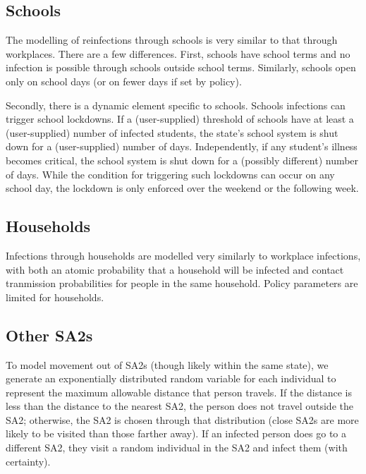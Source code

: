 \documentclass{grattan}
\begin{document}
\subsection{Schools}

The modelling of reinfections through schools is very similar to that through workplaces.
There are a few differences.
First, schools have school terms and no infection is possible through schools outside school terms.
Similarly, schools open only on school days (or on fewer days if set by policy).

Secondly, there is a dynamic element specific to schools. Schools infections can trigger school
lockdowns. If a (user-supplied) threshold of schools have at least a (user-supplied) number of 
infected students, the state's school system is shut down for a (user-supplied) number of days.
Independently, if any student's illness becomes critical, the school system is shut down for 
a (possibly different) number of days.  While the condition for triggering such lockdowns can occur
on any school day, the lockdown is only enforced over the weekend or the following week.

\subsection{Households}

Infections through households are modelled very similarly to workplace infections, 
with both an atomic probability that a household will be infected and contact
tranmission probabilities for people in the same household.
Policy parameters are limited for households.

\subsection{Other SA2s}

To model movement out of SA2s (though likely within the same state),
we generate an exponentially distributed random variable 
for each individual to represent the maximum allowable distance that person 
travels. If the distance is less than the distance to the nearest SA2, the person
does not travel outside the SA2; otherwise, the SA2 is chosen through that distribution
(close SA2s are more likely to be visited than those farther away).
 If an infected person does go to a different SA2, they visit a random individual in the SA2 and 
 infect them (with certainty).
\end{document}
